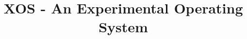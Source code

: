 \documentclass{sig-alternate}
\begin{document}
%
\conferenceinfo{}{}

\title{XOS - An Experimental Operating System }

%
%
%
%
%
\end{document}
